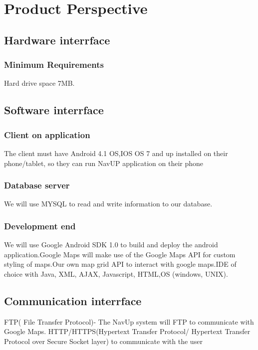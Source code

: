 \documentclass[11pt]{article}
\begin{document}
\clearpage
	
	\section{Product Perspective}
	 
		\subsection{Hardware interrface}
			\subsubsection{Minimum Requirements}
Hard drive space 7MB.
		
		\subsection{Software interrface}
			\subsubsection{Client on application}
The client must have Android 4.1 OS,IOS OS 7 and up installed on their phone/tablet, so they can run  NavUP application on their phone

			\subsubsection{Database server}	
We will use MYSQL to read and write information to our database.

			\subsubsection{Development end}
We will use Google Android SDK 1.0 to build and deploy the android application.Google Maps will make use of the Google Maps API for custom styling of maps.Our own map grid API to interact with google maps.IDE of choice with Java, XML, AJAX, Javascript, HTML,OS (windows, UNIX).
		\subsection{Communication interrface}
FTP( File Transfer Protocol)- The NavUp system will FTP to communicate with Google Maps.
HTTP/HTTPS(Hypertext Transfer Protocol/ Hypertext Transfer Protocol over Secure Socket layer) to communicate with the user

	
	
\end{document}
